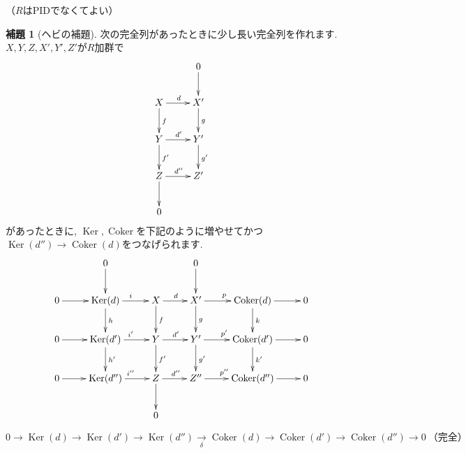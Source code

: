 \documentclass{jsarticle}
\newcommand{\makeop}[1]{\mathop{\mathrm{#1}}\nolimits}
\def\Ker{\makeop{Ker}}
\def\Coker{\makeop{Coker}}
\theoremstyle{definition}
\newtheorem{lemma}{補題}
\numberwithin{theorem}{section}
\begin{document}
（$R$はPIDでなくてよい）
\begin{lemma}[ヘビの補題]
次の完全列があったときに少し長い完全列を作れます. $X, Y, Z, X', Y', Z'$が$R$加群で
\begin{equation*}
\xymatrix{
  & 0 \ar[d]\\
  X \ar[r]^d \ar[d]^f & X' \ar[d]^g\\
  Y \ar[r]^{d'} \ar[d]^{f'} & Y' \ar[d]^{g'}\\
  Z \ar[r]^{d''} \ar[d] & Z'\\
  0 & \\
}
\end{equation*}
があったときに, $\Ker, \Coker$を下記のように増やせてかつ$\Ker(d'') \rightarrow \Coker(d)$をつなげられます.
\begin{equation*}
\xymatrix{
  & 0 \ar[d] & & 0 \ar[d] \\
  0 \ar[r] & \Ker(d)   \ar[r]^i     \ar[d]^h    & X \ar[r]^d     \ar[d]^f    & X'  \ar[r]^p    \ar[d]^g    & \Coker(d)  \ar[r] \ar[d]^k    & 0\\
  0 \ar[r] & \Ker(d')  \ar[r]^{i'}  \ar[d]^{h'} & Y \ar[r]^{d'}  \ar[d]^{f'} & Y'  \ar[r]^{p'} \ar[d]^{g'} & \Coker(d') \ar[r] \ar[d]^{k'} & 0\\
  0 \ar[r] & \Ker(d'') \ar[r]^{i''}              & Z \ar[r]^{d''} \ar[d]      & Z'' \ar[r]^{p''}             & \Coker(d'') \ar[r]             & 0\\
            &                                      & 0
}
\end{equation*}

\begin{equation*}
0 \rightarrow \Ker(d) \rightarrow \Ker(d') \rightarrow \Ker(d'') \xrightarrow[\delta]{} \Coker(d) \rightarrow \Coker(d') \rightarrow \Coker(d'') \rightarrow 0\ （完全）
\end{equation*}
\end{lemma}
\end{document}
